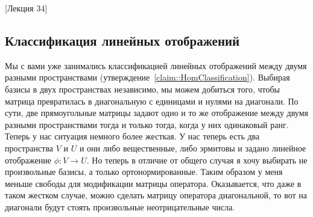 [Лекция 34]


\subsection{Классификация линейных отображений}

Мы с вами уже занимались классификацией линейных отображений между двумя разными пространствами (утверждение~\ref{claim::HomClassification}).
Выбирая базисы в двух пространствах независимо, мы можем добиться того, чтобы матрица превратилась в диагональную с единицами и нулями на диагонали.
По сути, две прямоугольные матрицы задают одно и то же отображение между двумя разными пространствами тогда и только тогда, когда у них одинаковый ранг.
Теперь у нас ситуация немного более жесткая.
У нас теперь есть два пространства $V$ и $U$ и они либо вещественные, либо эрмитовы и задано линейное отображение $\phi\colon V\to U$.
Но теперь в отличие от общего случая я хочу выбирать не произвольные базисы, а только ортонормированные.
Таким образом у меня меньше свободы для модификации матрицы оператора.
Оказывается, что даже в таком жестком случае, можно сделать матрицу оператора диагональной, то вот на диагонали будут стоять произвольные неотрицательные числа.

